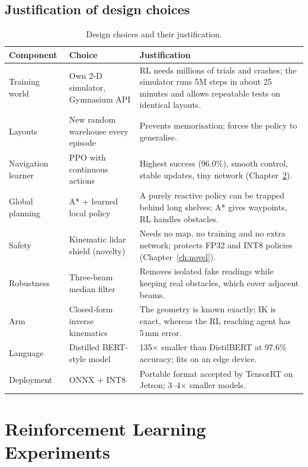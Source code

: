 \documentclass[12pt,a4paper,oneside]{report}
\begin{document}
\section{Justification of design choices}
\begin{table}[H]
\centering\small
\caption{Design choices and their justification.}
\label{tab:choices}
\begin{tabularx}{\linewidth}{lYY}
\toprule
Component & Choice & Justification \\
\midrule
Training world & Own 2-D simulator, Gymnasium API & RL needs millions of trials and crashes; the simulator runs 5M steps in about 25 minutes and allows repeatable tests on identical layouts. \\
Layouts & New random warehouse every episode & Prevents memorisation; forces the policy to generalise. \\
Navigation learner & PPO with continuous actions & Highest success (96.0\%), smooth control, stable updates, tiny network (Chapter~\ref{ch:rl}). \\
Global planning & A* + learned local policy & A purely reactive policy can be trapped behind long shelves; A* gives waypoints, RL handles obstacles. \\
Safety & Kinematic lidar shield (novelty) & Needs no map, no training and no extra network; protects FP32 and INT8 policies (Chapter~\ref{ch:novel}). \\
Robustness & Three-beam median filter & Removes isolated fake readings while keeping real obstacles, which cover adjacent beams. \\
Arm & Closed-form inverse kinematics & The geometry is known exactly; IK is exact, whereas the RL reaching agent has 5\,mm error. \\
Language & Distilled BERT-style model & 135$\times$ smaller than DistilBERT at 97.6\% accuracy; fits on an edge device. \\
Deployment & ONNX + INT8 & Portable format accepted by TensorRT on Jetson; 3--4$\times$ smaller models. \\
\bottomrule
\end{tabularx}
\end{table}

\chapter{Reinforcement Learning Experiments}
\label{ch:rl}
\end{document}
